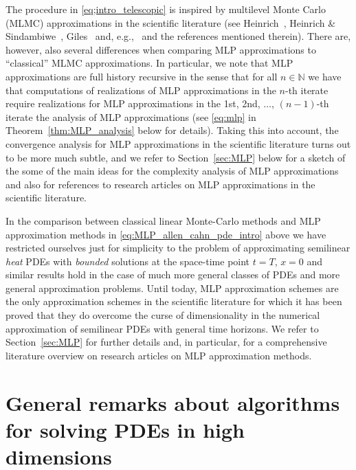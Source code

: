 \documentclass[12pt]{article}
\theoremstyle{definition}
\newcommand{\N}{\mathbb{N}}
\begin{document}
The procedure in \eqref{eq;intro_telescopic} is inspired by multilevel Monte Carlo (MLMC) approximations 
in the scientific literature (see Heinrich~\cite{heinrich1998monte}, Heinrich \& Sindambiwe~\cite{heinrich1999monte}, Giles~\cite{giles2008multilevel} and, e.g.,~\cite{heinrich2001multilevel,giles2015multilevel} and the references mentioned therein). 
There are, however, also several differences when comparing MLP approximations 
to ``classical'' MLMC approximations. In particular, we note that MLP approximations are 
full history recursive in the sense that for all $ n \in \N $ we have that computations of realizations of MLP approximations in the $ n $-th iterate require realizations for MLP approximations 
in the 1st, 2nd, $ \dots $, $ (n - 1) $-th iterate 
the analysis of MLP approximations (see \eqref{eq:mlp} 
in Theorem~\ref{thm:MLP_analysis} below for details). 
Taking this into account, the convergence analysis for MLP approximations in the scientific literature 
turns out to be more much subtle, and we refer to Section~\ref{sec:MLP} below 
for a sketch of the some of the main ideas for the complexity analysis of MLP approximations
and also for references to research articles on MLP approximations in the scientific literature.


In the comparison between 
classical linear Monte-Carlo methods 
and MLP approximation methods 
in \eqref{eq:MLP_allen_cahn_pde_intro} above 
we have restricted ourselves just for simplicity 
to the problem of approximating 
semilinear \emph{heat} PDEs with \emph{bounded} solutions 
at the space-time point $ t = T $, $ x = 0 $ 
and similar results hold in the case of much more general classes 
of PDEs and more general approximation problems. 
Until today, MLP approximation schemes are the only approximation schemes 
in the scientific literature for which it has been proved
that they do overcome the curse of dimensionality 
in the numerical approximation 
of semilinear PDEs with general time horizons. 
We refer to Section~\ref{sec:MLP} for further details and, in particular, 
for a comprehensive literature overview on research articles 
on MLP approximation methods. 






\section{General remarks about algorithms for solving PDEs in high dimensions}
\label{sec:general_remarks}
\end{document}
